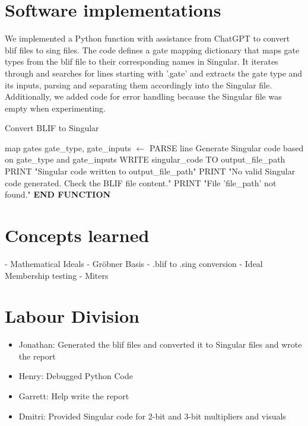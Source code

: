 \documentclass[conference]{IEEEtran}
\begin{document}
\section{Software implementations}
We implemented a Python function with assistance from ChatGPT to convert blif files to sing files. The code defines a gate mapping dictionary that maps gate types 
from the blif file to their corresponding names in Singular. It iterates through and searches for lines starting with '.gate' and extracts the gate type and its 
inputs, parsing and separating them accordingly into the Singular file. Additionally, we added code for error handling because the Singular file was empty when 
experimenting. 
\begin{algorithm}
    \caption{Convert BLIF to Singular}
    \begin{algorithmic}
            \STATE map gates
                    \STATE gate\_type, gate\_inputs $\gets$ PARSE line
                        \STATE Generate Singular code based on gate\_type and gate\_inputs
                    \ENDIF
                \ENDIF
            \ENDFOR
                \STATE WRITE singular\_code TO output\_file\_path
                \STATE PRINT "Singular code written to output\_file\_path"
            \ELSE
                \STATE PRINT "No valid Singular code generated. Check the BLIF file content."
            \ENDIF
        \ELSE
            \STATE PRINT "File 'file\_path' not found."
        \ENDIF
        \STATE \textbf{END FUNCTION}
    \end{algorithmic}
    \end{algorithm}

\section{Concepts learned}
- Mathematical Ideals
- Gröbner Basis
- .blif to .sing conversion
- Ideal Membership testing
- Miters

\section{Labour Division}
\begin{itemize}
    \item Jonathan: Generated the blif files and converted it to Singular files and wrote the report
    \item Henry: Debugged Python Code 
    \item Garrett: Help write the report
    \item Dmitri: Provided Singular code for 2-bit and 3-bit multipliers and visuals
\end{itemize}
\end{document}
